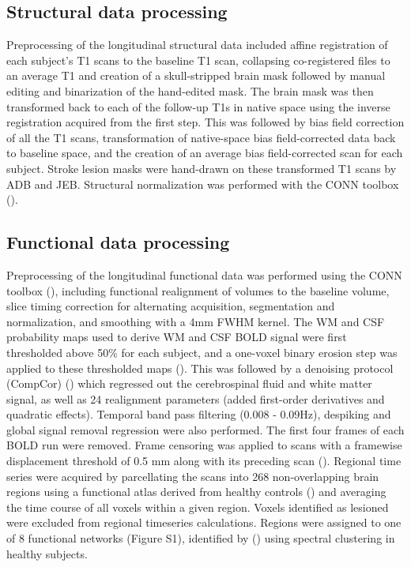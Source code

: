 \documentclass[phd,tocprelim]{cornell}
\begin{document}
	\subsection{Structural data processing}
	Preprocessing of the longitudinal structural data included affine registration of each subject’s T1 scans to the baseline T1 scan, collapsing co-registered files to an average T1 and creation of a skull-stripped brain mask followed by manual editing and binarization of the hand-edited mask. The brain mask was then transformed back to each of the follow-up T1s in native space using the inverse registration acquired from the first step. This was followed by bias field correction of all the T1 scans, transformation of native-space bias field-corrected data back to baseline space, and the creation of an average bias field-corrected scan for each subject. Stroke lesion masks were hand-drawn on these transformed T1 scans by ADB and JEB. Structural normalization was performed with the CONN toolbox (\cite{Whitfield-Gabrieli2012-ox}). 
	
	\subsection{Functional data processing}
	Preprocessing of the longitudinal functional data was performed using the CONN toolbox (\cite{Whitfield-Gabrieli2012-ox}), including functional realignment of volumes to the baseline volume, slice timing correction for alternating acquisition, segmentation and normalization, and smoothing with a 4mm FWHM kernel. The WM and CSF probability maps used to derive WM and CSF BOLD signal were first thresholded above 50\% for each subject, and a one-voxel binary erosion step was applied to these thresholded maps (\cite{Whitfield-Gabrieli2012-ox}). This was followed by a denoising protocol (CompCor) (\cite{Behzadi2007-zt}) which regressed out the cerebrospinal fluid and white matter signal, as well as 24 realignment parameters (added first-order derivatives and quadratic effects). Temporal band pass filtering (0.008 - 0.09Hz), despiking and global signal removal regression were also performed. The first four frames of each BOLD run were removed. Frame censoring was applied to scans with a framewise displacement threshold of 0.5 mm along with its preceding scan (\cite{Power2012-tq}). Regional time series were acquired by parcellating the scans into 268 non-overlapping brain regions using a functional atlas derived from healthy controls (\cite{Shen2013-zn}) and averaging the time course of all voxels within a given region. Voxels identified as lesioned were excluded from regional timeseries calculations. Regions were assigned to one of 8 functional networks (Figure S1), identified by (\cite{Finn2015-er}) using spectral clustering in healthy subjects.
	
\end{document}

